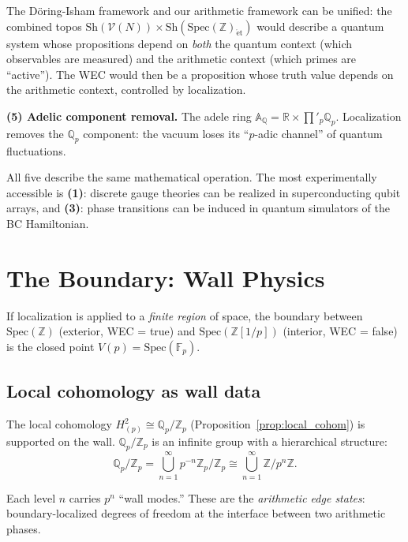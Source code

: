 \documentclass[aps,prd,twocolumn,superscriptaddress,nofootinbib]{revtex4-2}
\newcommand{\Spec}{\mathrm{Spec}}
\newcommand{\Zp}{\mathbb{Z}[1/p]}
\newcommand{\Qp}{\mathbb{Q}_p}
\newcommand{\Fp}{\mathbb{F}_p}
\begin{document}
The D\"oring-Isham framework and our arithmetic
framework can be unified: the combined topos
$\mathrm{Sh}(\mathcal{V}(N)) \times \mathrm{Sh}(\Spec(\mathbb{Z})_{\mathrm{\acute{e}t}})$
would describe a quantum system whose propositions depend on
\emph{both} the quantum context (which observables are measured)
and the arithmetic context (which primes are ``active'').
The WEC would then be a proposition whose truth value depends
on the arithmetic context, controlled by localization.

\textbf{(5) Adelic component removal.}
The adele ring $\mathbb{A}_\mathbb{Q} = \mathbb{R} \times \prod'_p \Qp$.
Localization removes the $\Qp$ component: the vacuum loses its
``$p$-adic channel'' of quantum fluctuations.

All five describe the same mathematical operation. The most
experimentally accessible is \textbf{(1)}: discrete gauge theories
can be realized in superconducting qubit arrays, and
\textbf{(3)}: phase transitions can be induced in quantum
simulators of the BC Hamiltonian.

\section{The Boundary: Wall Physics}
\label{sec:boundary}

If localization is applied to a \emph{finite region} of space,
the boundary between $\Spec(\mathbb{Z})$ (exterior, WEC = true)
and $\Spec(\Zp)$ (interior, WEC = false) is the closed point
$V(p) = \Spec(\Fp)$.

\subsection{Local cohomology as wall data}

The local cohomology $H^2_{(p)} \cong \Qp/\mathbb{Z}_p$
(Proposition~\ref{prop:local_cohom}) is supported on the wall.
$\Qp/\mathbb{Z}_p$ is an infinite group with a hierarchical
structure:
\begin{equation}
  \Qp/\mathbb{Z}_p = \bigcup_{n=1}^{\infty} p^{-n}\mathbb{Z}_p / \mathbb{Z}_p
  \cong \bigcup_{n=1}^{\infty} \mathbb{Z}/p^n\mathbb{Z}.
\end{equation}

Each level $n$ carries $p^n$ ``wall modes.'' These are the
\emph{arithmetic edge states}: boundary-localized degrees of
freedom at the interface between two arithmetic phases.
\end{document}

